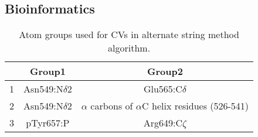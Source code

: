 \subsection{Bioinformatics}

\begin{table}[h]
 \caption{Atom groups used for CVs in alternate string method algorithm.}\vspace{0.5cm}
 \centering
	\begin{tabular}{|c| c| c|}
	\hline
	& \textbf{Group1} & \textbf{Group2} \\
	\hline
	1 & Asn549:N$\delta$2 & Glu565:C$\delta$ \\
	\hline
	2 & Asn549:N$\delta$2 & $\alpha$ carbons of $\alpha$C helix residues (526-541) \\
	\hline
	3 & pTyr657:P & Arg649:C$\zeta$ \\
	\hline
	\end{tabular}
\end{table}

